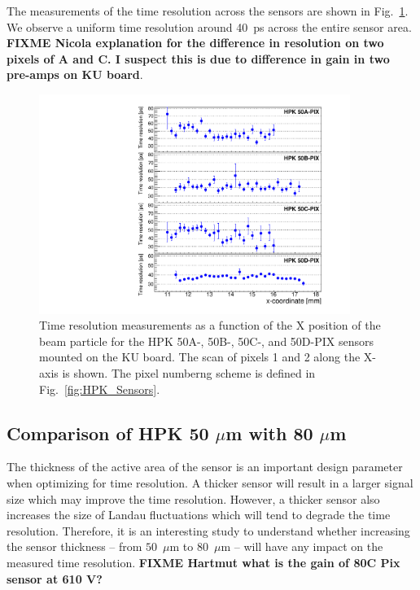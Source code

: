\documentclass[preprint,1p]{elsarticle}
\begin{document}
The measurements of the time resolution across the sensors are shown in
Fig.~\ref{fig:KUBoard_50ABCD_TimeResolution}. We observe a uniform time
resolution around 40~ps across the entire sensor area. \textbf {FIXME Nicola explanation
for the difference in resolution on two pixels of A and C. I suspect this is due
to difference in gain in two pre-amps on KU board}.


\begin{figure}[htbp] 
\centering
\includegraphics[width=0.9\textwidth]{figs/KUBoard_HPK50ABCD/KUBoard_50ABCD_TimeResolution.pdf} 
\caption{Time resolution measurements as a function of the X position of the beam particle
for the HPK 50A-, 50B-, 50C-, and 50D-PIX sensors mounted on the KU board. The scan of 
pixels 1 and 2 along the X-axis is shown. The pixel numberng scheme is 
defined in Fig.~\ref{fig:HPK_Sensors}.} 
\label{fig:KUBoard_50ABCD_TimeResolution} 
\end{figure} 


\subsection{Comparison of HPK 50 $\mu$m with 80 $\mu$m}
\label{sec:HPK50vs80}

The thickness of the active area of the sensor is an important design parameter
when optimizing for time resolution. A thicker sensor will result in a larger
signal size which may improve the time resolution. However, a thicker sensor
also increases the size of Landau fluctuations which will tend to degrade the
time resolution. Therefore, it is an interesting study to understand whether
increasing the sensor thickness -- from $50$~$\mu$m to $80$~$\mu$m -- will have
any impact on the measured time resolution. \textbf {FIXME Hartmut what is the gain of 80C Pix sensor at 610 V?}
\end{document}
